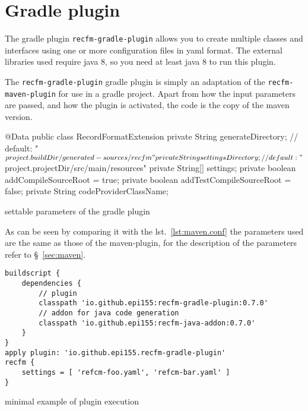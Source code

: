 \chapter{Gradle plugin}\label{sec:gradle}
The gradle plugin \verb!recfm-gradle-plugin! allows you to create multiple 
classes and interfaces using one or more configuration files in yaml format. 
The external libraries used require java 8, so you need at least java 8 to run 
this plugin.

The \verb!recfm-gradle-plugin! gradle plugin is simply an adaptation of the 
\verb!recfm-maven-plugin! for use in a gradle project. 
Apart from how the input parameters are passed, and how the plugin is activated, 
the code is the copy of the maven version.

\begin{elisting}[!htb]
\begin{javacode}
@Data
public class RecordFormatExtension {
    private String generateDirectory; // default: "${project.buildDir}/generated-sources/recfm"
    private String settingsDirectory; // default: "${project.projectDir}/src/main/resources"
    private String[] settings;
    private boolean addCompileSourceRoot = true;
    private boolean addTestCompileSourceRoot = false;
    private String codeProviderClassName;
}
\end{javacode}
\caption{settable parameters of the gradle plugin}
\label{lst:gradle.conf}
\end{elisting}
As can be seen by comparing it with the lst.~\ref{lst:maven.conf} the parameters 
used are the same as those of the maven-plugin, for the description of the 
parameters refer to \S~\ref{sec:maven}.

\begin{elisting}[!htb]
\begin{verbatim}
buildscript {
    dependencies {
        // plugin
        classpath 'io.github.epi155:recfm-gradle-plugin:0.7.0'
        // addon for java code generation
        classpath 'io.github.epi155:recfm-java-addon:0.7.0'
    }
}
apply plugin: 'io.github.epi155.recfm-gradle-plugin'
recfm {
    settings = [ 'refcm-foo.yaml', 'refcm-bar.yaml' ]
}
\end{verbatim}
\caption{minimal example of plugin execution}
\label{lst:grd-xmpl}
\end{elisting}
